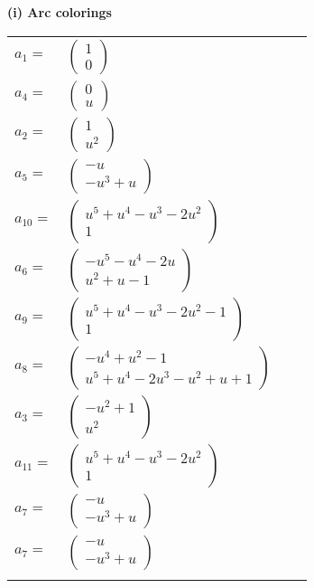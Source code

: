 \documentclass[1p]{elsarticle_modified}
\theoremstyle{definition}
\begin{document}
\flushleft \textbf{(i) Arc colorings}\\
\begin{tabular}{m{7pt} m{180pt} m{7pt} m{180pt} }
\flushright $a_{1}=$&$\begin{pmatrix}1\\0\end{pmatrix}$ \\
\flushright $a_{4}=$&$\begin{pmatrix}0\\u\end{pmatrix}$ \\
\flushright $a_{2}=$&$\begin{pmatrix}1\\u^2\end{pmatrix}$ \\
\flushright $a_{5}=$&$\begin{pmatrix}- u\\- u^3+u\end{pmatrix}$ \\
\flushright $a_{10}=$&$\begin{pmatrix}u^5+u^4- u^3-2 u^2\\1\end{pmatrix}$ \\
\flushright $a_{6}=$&$\begin{pmatrix}- u^5- u^4-2 u\\u^2+u-1\end{pmatrix}$ \\
\flushright $a_{9}=$&$\begin{pmatrix}u^5+u^4- u^3-2 u^2-1\\1\end{pmatrix}$ \\
\flushright $a_{8}=$&$\begin{pmatrix}- u^4+u^2-1\\u^5+u^4-2 u^3- u^2+u+1\end{pmatrix}$ \\
\flushright $a_{3}=$&$\begin{pmatrix}- u^2+1\\u^2\end{pmatrix}$ \\
\flushright $a_{11}=$&$\begin{pmatrix}u^5+u^4- u^3-2 u^2\\1\end{pmatrix}$ \\
\flushright $a_{7}=$&$\begin{pmatrix}- u\\- u^3+u\end{pmatrix}$\\ \flushright $a_{7}=$&$\begin{pmatrix}- u\\- u^3+u\end{pmatrix}$\\&\end{tabular}
\end{document}
